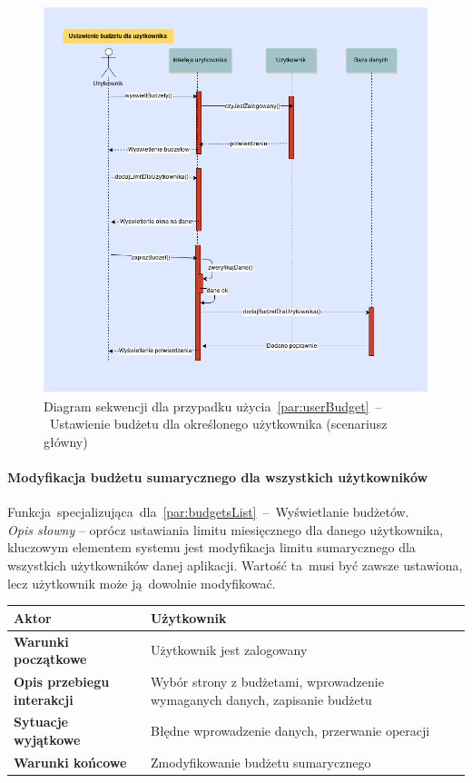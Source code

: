 \begin{figure}[H]
  \includegraphics[width=\textwidth]{images/dodanie_budzetu_dla_usera.png}
  \caption{Diagram sekwencji dla przypadku użycia~\ref{par:userBudget}~--~Ustawienie budżetu dla określonego użytkownika (scenariusz główny)}
\end{figure}

\paragraph{Modyfikacja budżetu sumarycznego dla wszystkich użytkowników\newline}
\label{par:usersBudget}
Funkcja~specjalizująca~dla~\ref{par:budgetsList}~--~Wyświetlanie budżetów.\\

\textit{Opis słowny} -- oprócz ustawiania limitu miesięcznego dla danego użytkownika, kluczowym elementem systemu jest modyfikacja limitu sumarycznego dla wszystkich użytkowników danej aplikacji. Wartość ta~musi być zawsze ustawiona, lecz użytkownik może ją~dowolnie modyfikować.

\begin{longtable}{|p{5cm}|p{7cm}|}
  \hline \textbf{Aktor} & Użytkownik \\
  \hline \textbf{Warunki początkowe} & Użytkownik jest zalogowany \\
  \hline \textbf{Opis przebiegu interakcji} & Wybór strony z budżetami, wprowadzenie wymaganych danych, zapisanie budżetu \\
  \hline \textbf{Sytuacje wyjątkowe} & Błędne wprowadzenie danych, przerwanie operacji \\
  \hline \textbf{Warunki końcowe} & Zmodyfikowanie budżetu sumarycznego \\
  \hline
\end{longtable}

